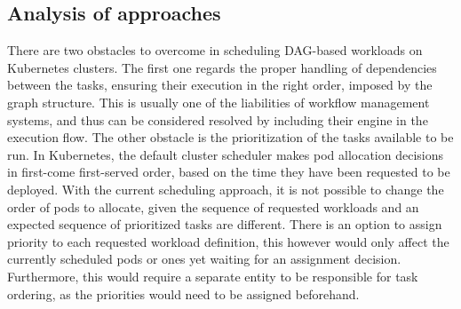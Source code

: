 \subsection{Analysis of approaches}\label{s:SchedHyperflow:Deliberation}







There are two obstacles to overcome in scheduling DAG-based workloads on Kubernetes clusters.
The first one regards the proper handling of dependencies between the tasks, ensuring their execution in the right order, imposed by the graph structure.
This is usually one of the liabilities of workflow management systems, and thus can be considered resolved by including their engine in the execution flow.
%
The other obstacle is the prioritization of the tasks available to be run.
In Kubernetes, the default cluster scheduler makes pod allocation decisions in first-come first-served order, based on the time they have been requested to be deployed.
With the current scheduling approach, it is not possible to change the order of pods to allocate, given the sequence of requested workloads and an expected sequence of prioritized tasks are different.
There is an option to assign priority to each requested workload definition, this however would only affect the currently scheduled pods or ones yet waiting for an assignment decision.
Furthermore, this would require a separate entity to be responsible for task ordering, as the priorities would need to be assigned beforehand. 


